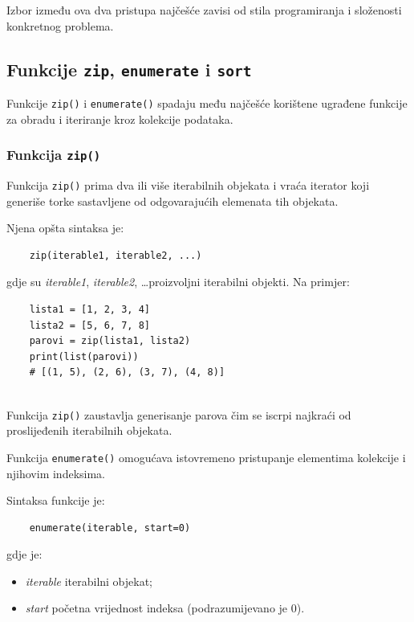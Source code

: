 Izbor između ova dva pristupa najčešće zavisi od stila programiranja i složenosti konkretnog problema.


\subsection{Funkcije \texttt{zip}, \texttt{enumerate} i \texttt{sort}}

Funkcije \texttt{zip()} i \texttt{enumerate()} spadaju među najčešće korištene ugrađene funkcije za obradu i iteriranje kroz kolekcije podataka.

\subsubsection*{Funkcija \texttt{zip()}}

Funkcija \texttt{zip()} prima dva ili više iterabilnih objekata i vraća iterator koji generiše torke sastavljene od odgovarajućih elemenata tih objekata.

Njena opšta sintaksa je:
\begin{verbatim}
	zip(iterable1, iterable2, ...)
\end{verbatim}

gdje su \textit{iterable1}, \textit{iterable2}, \ldots proizvoljni iterabilni objekti. Na primjer:

\begin{verbatim}
	lista1 = [1, 2, 3, 4]
	lista2 = [5, 6, 7, 8]
	parovi = zip(lista1, lista2)
	print(list(parovi))
	# [(1, 5), (2, 6), (3, 7), (4, 8)]
	
\end{verbatim}

Funkcija \texttt{zip()} zaustavlja generisanje parova čim se iscrpi najkraći od proslijeđenih iterabilnih objekata.


Funkcija \texttt{enumerate()} omogućava istovremeno pristupanje elementima kolekcije i njihovim indeksima.

Sintaksa funkcije je:

\begin{verbatim}
	enumerate(iterable, start=0)
\end{verbatim}

gdje je:

\begin{itemize}
	\item \textit{iterable} iterabilni objekat;
	\item \textit{start} početna vrijednost indeksa (podrazumijevano je 0).
\end{itemize}


